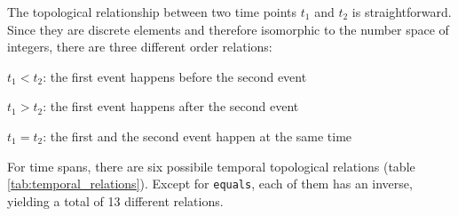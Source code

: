 The topological relationship between two time points $t_1$ and $t_2$ is straightforward. Since they are discrete elements and therefore isomorphic to the number space of integers, there are three different order relations:
\begin{compactenum}
  \item $t_1 < t_2$: the first event happens before the second event
  \item $t_1 > t_2$: the first event happens after the second event
  \item $t_1 = t_2$: the first and the second event happen at the same time
\end{compactenum}

For time spans, there are six possibile temporal topological relations (table \ref{tab:temporal_relations}). Except for \texttt{equals}, each of them has an inverse, yielding a total of 13 different relations.

